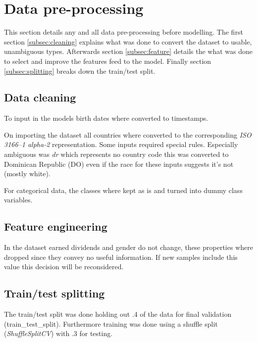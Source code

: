 \section{Data pre-processing}
\label{sec:data}

This section details any and all data pre-processing before modelling.
The first section \vref{subsec:cleaning} explains what was done to
convert the dataset to usable, unambiguous types.
Afterwards section \vref{subsec:feature} details the what was
done to select and improve the features feed to the model.
Finally section \vref{subsec:splitting} breaks down the train/test split.


\subsection{Data cleaning}
\label{subsec:cleaning}

To input in the models birth dates where converted to timestamps.


On importing the dataset all countries where converted
to the corresponding \emph{ISO 3166--1 alpha-2} representation.
Some inputs required special rules.
Especially ambiguous was \emph{dr} which
represents no country code this was converted to Dominican Republic (DO)
even if the race for these inputs suggests it's not (mostly white).

For categorical data, the classes where kept as is and turned into dummy class
variables.



\subsection{Feature engineering}
\label{subsec:feature}

In the dataset earned dividends and gender do not change,
these properties where dropped since they convey no useful information.
If new samples include this value this decision will be reconsidered.


\subsection{Train/test splitting}
\label{subsec:splitting}

The train/test split was done holding out .4 of the data for final
validation (train{\_}test{\_}split).
Furthermore training was done using a shuffle split (\emph{ShuffleSplitCV})
with .3 for testing.

